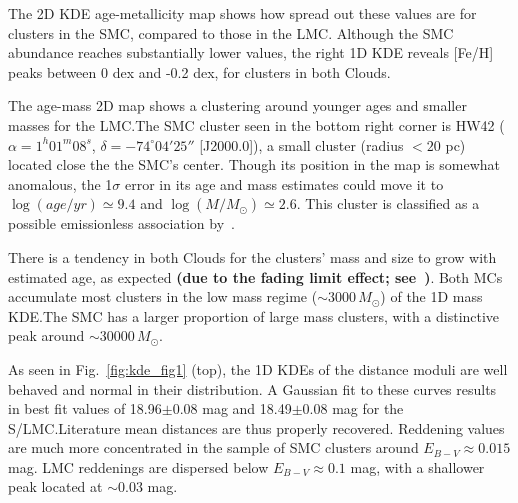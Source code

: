 \documentclass[referee]{aa}
\begin{document}
The 2D KDE age-metallicity map shows how spread out these values are for
clusters in the SMC, compared to those in the LMC.\@
Although the SMC abundance reaches substantially lower values, the right 1D KDE
reveals [Fe/H] peaks between 0 dex and -0.2 dex, for clusters in both Clouds.

The age-mass 2D map shows a clustering around younger ages and smaller masses
for the LMC.\@ The SMC cluster seen in the bottom right corner is HW42
($\alpha{=}1^h01^m08^s$, $\delta{=}-74^\circ04'25''$ [J2000.0]),
a small cluster (radius ${<}20$ pc) located close the the SMC's center. Though
its position in the map is somewhat anomalous, the 1$\sigma$ error in its age
and mass estimates could move it to $\log(age/yr){\simeq}9.4$ and $\log(M/M_
{\odot}){\simeq}2.6$. This cluster is classified as a possible emissionless
association by~\cite{Bica_1995}.

There is a tendency in both Clouds for the clusters' mass and size to
grow with estimated age, as expected \textbf{(due to the fading limit
effect; see~\citealp[][Sect. 4]{Popescu_2012})}.
Both MCs accumulate most clusters in the low mass regime
(${\sim}3000\,M_{\odot}$) of the 1D mass KDE.\@ The SMC has a larger
proportion of large mass clusters, with a distinctive peak around
${\sim}30000\,M_{\odot}$.

As seen in Fig.~\ref{fig:kde_fig1} (top), the 1D KDEs of the distance
moduli are well behaved and normal in their distribution.
A Gaussian fit to these curves results in best fit values of 18.96$\pm$0.08 mag
and 18.49$\pm$0.08 mag for the S/LMC.\@ Literature mean distances are thus
properly recovered.
%
Reddening values are much more concentrated in the sample of SMC clusters
around $E_{B-V}{\approx}0.015$ mag. LMC reddenings are dispersed below $E_{B-V}
{\approx}0.1$ mag, with a shallower peak located at ${\sim}0.03$ mag.




\end{document}
